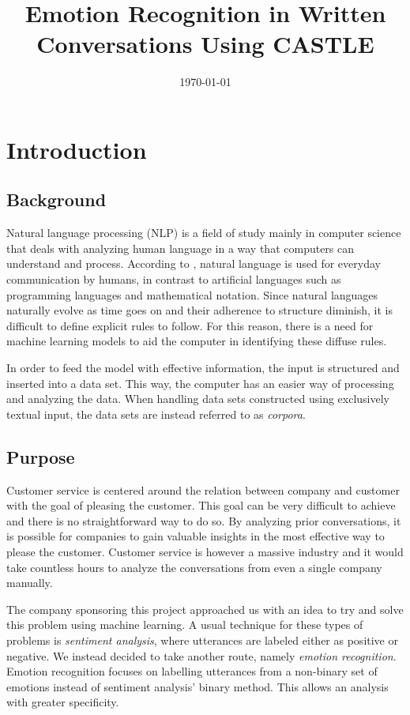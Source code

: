 \documentclass[nofilelist]{cslthse-msc}
\title{Emotion Recognition in Written Conversations Using CASTLE}
\subtitle{\protect\icon{CASTLE}}
\date{\today}
\begin{document}
\renewcommand{\bibname}{References}

\makefrontmatter
\chapter{Introduction}


\section{Background}
Natural language processing (NLP) is a field of study mainly in computer science that deals with analyzing human language in a way that computers can understand and process. According to \citet{ntlk2009}, natural language is used for everyday communication by humans, in contrast to artificial languages such as programming languages and mathematical notation. Since natural languages naturally evolve as time goes on and their adherence to structure diminish, it is difficult to define explicit rules to follow. For this reason, there is a need for machine learning models to aid the computer in identifying these diffuse rules. 

In order to feed the model with effective information, the input is structured and inserted into a data set. This way, the computer has an easier way of processing and analyzing the data. When handling data sets constructed using exclusively textual input, the data sets are instead referred to as \textit{corpora}. 




\section{Purpose}
Customer service is centered around the relation between company and customer with the goal of pleasing the customer. This goal can be very difficult to achieve and there is no straightforward way to do so. By analyzing prior conversations, it is possible for companies to gain valuable insights in the most effective way to please the customer. Customer service is however a massive industry and it would take countless hours to analyze the conversations from even a single company manually. 

The company sponsoring this project approached us with an idea to try and solve this problem using machine learning. A usual technique for these types of problems is \textit{sentiment analysis}, where utterances are labeled either as positive or negative. We instead decided to take another route, namely \textit{emotion recognition}. Emotion recognition focuses on labelling utterances from a non-binary set of emotions instead of sentiment analysis' binary method. This allows an analysis with greater specificity.  
\end{document}
